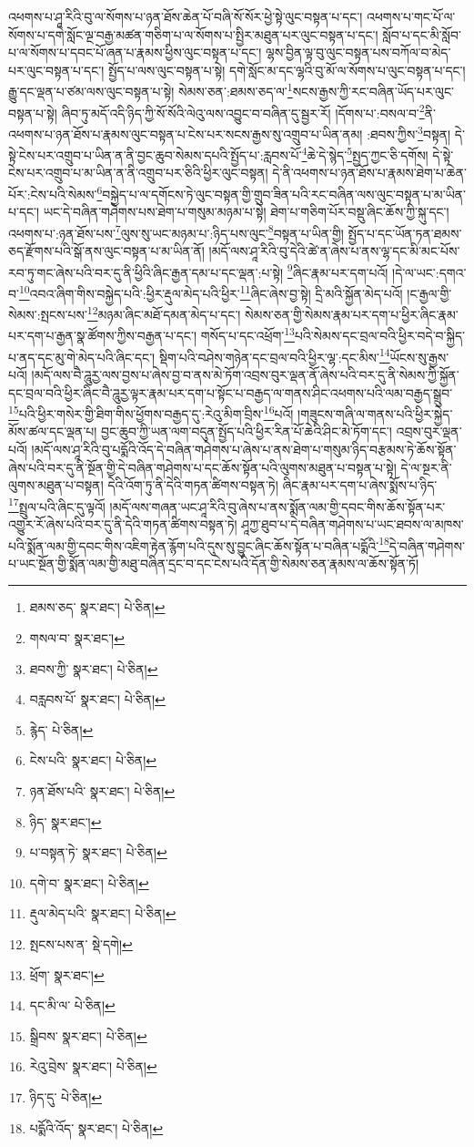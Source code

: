 འཕགས་པ་ཤཱ་རིའི་བུ་ལ་སོགས་པ་ཉན་ཐོས་ཆེན་པོ་བཞི་སོ་སོར་ཕྱེ་སྟེ་ལུང་བསྟན་པ་དང་། འཕགས་པ་གང་པོ་ལ་སོགས་པ་དགེ་སློང་ལྔ་བརྒྱ་མཚན་གཅིག་པ་ལ་སོགས་པ་སྤྱིར་མཐུན་པར་ལུང་བསྟན་པ་དང་། སློབ་པ་དང་མི་སློབ་པ་ལ་སོགས་པ་དབང་པོ་ཞན་པ་རྣམས་ཕྱིས་ལུང་བསྟན་པ་དང་། ལྷས་བྱིན་ལྟ་བུ་ལུང་བསྟན་པས་བཀོལ་བ་མེད་པར་ལུང་བསྟན་པ་དང་། སྤྱོད་པ་ལས་ལུང་བསྟན་པ་སྟེ། དགེ་སློང་མ་དང་ལྷའི་བུ་མོ་ལ་སོགས་པ་ལུང་བསྟན་པ་དང་། རྒྱུ་དང་ལྡན་པ་ཙམ་ལས་ལུང་བསྟན་པ་སྟེ། སེམས་ཅན་:ཐམས་ཅད་ལ་\footnote{ཐམས་ཅད་  སྣར་ཐང་།  པེ་ཅིན། }སངས་རྒྱས་ཀྱི་རང་བཞིན་ཡོད་པར་ལུང་བསྟན་པ་སྟེ། ཞིབ་ཏུ་མདོ་འདི་ཉིད་ཀྱི་སོ་སོའི་ལེའུ་ལས་འབྱུང་བ་བཞིན་དུ་སྦྱར་རོ། །དོགས་པ་:བསལ་བ་\footnote{གསལ་བ་  སྣར་ཐང་། }ནི་འཕགས་པ་ཉན་ཐོས་པ་རྣམས་ལུང་བསྟན་པ་ངེས་པར་སངས་རྒྱས་སུ་འགྲུབ་པ་ཡིན་ནམ། :ཐབས་ཀྱིས་\footnote{ཐབས་ཀྱི་  སྣར་ཐང་།  པེ་ཅིན། }བསྟན། དེ་སྟེ་ངེས་པར་འགྲུབ་པ་ཡིན་ན་ནི་བྱང་ཆུབ་སེམས་དཔའི་སྤྱོད་པ་:རླབས་པོ་\footnote{བརླབས་པོ་  སྣར་ཐང་།  པེ་ཅིན། }ཆེ་དེ་སྙེད་\footnote{རྙེད་  པེ་ཅིན། }སྤྱད་ཀྱང་ཅི་དགོས། དེ་སྟེ་ངེས་པར་འགྲུབ་པ་མ་ཡིན་ན་ནི་འགྲུབ་པར་ཅིའི་ཕྱིར་ལུང་བསྟན། དེ་ནི་འཕགས་པ་ཉན་ཐོས་པ་རྣམས་ཐེག་པ་ཆེན་པོར་:ངེས་པའི་སེམས་\footnote{ངེས་པའི་  སྣར་ཐང་།  པེ་ཅིན། }བསྐྱེད་པ་ལ་དགོངས་ཏེ་ལུང་བསྟན་གྱི་གྲུབ་ཟིན་པའི་རང་བཞིན་ལས་ལུང་བསྟན་པ་མ་ཡིན་པ་དང་། ཡང་དེ་བཞིན་གཤེགས་པས་ཐེག་པ་གསུམ་མཉམ་པ་སྟེ། ཐེག་པ་གཅིག་པོར་བསྡུ་ཞིང་ཆོས་ཀྱི་སྐུ་དང་། འཕགས་པ་:ཉན་ཐོས་པས་\footnote{ཉན་ཐོས་པའི་  སྣར་ཐང་།  པེ་ཅིན། }ལུས་སུ་ཡང་མཉམ་པ་:ཉིད་པས་ལུང་\footnote{ཉིད་  སྣར་ཐང་། }བསྟན་པ་ཡིན་གྱི། སྤྱོད་པ་དང་ཡོན་ཏན་ཐམས་ཅད་རྫོགས་པའི་སྒོ་ནས་ལུང་བསྟན་པ་མ་ཡིན་ནོ། །མདོ་ལས་ཤཱ་རིའི་བུ་དེའི་ཚེ་ན་ཞེས་པ་ནས་ལྷ་དང་མི་མང་པོས་རབ་ཏུ་གང་ཞེས་པའི་བར་དུ་ནི་ཕྱིའི་ཞིང་རྒྱན་དམ་པ་དང་ལྡན་:པ་སྟེ། \footnote{པ་བསྟན་ཏེ་  སྣར་ཐང་།  པེ་ཅིན། }ཞིང་རྣམ་པར་དག་པའོ། །དེ་ལ་ཡང་:དགའ་བ་\footnote{དགེ་བ་  སྣར་ཐང་།  པེ་ཅིན། }འབའ་ཞིག་གིས་བསྐྱེད་པའི་:ཕྱིར་རྡུལ་མེད་པའི་ཕྱིར་\footnote{རྡུལ་མེད་པའི་  སྣར་ཐང་།  པེ་ཅིན། }ཞིང་ཞེས་བྱ་སྟེ། དྲི་མའི་སྐྱོན་མེད་པའོ། །ང་རྒྱལ་གྱི་སེམས་:སྤངས་པས་\footnote{སྤངས་པས་ན་  སྡེ་དགེ། }མཉམ་ཞིང་མཐོ་དམན་མེད་པ་དང་། སེམས་ཅན་གྱི་སེམས་རྣམ་པར་དག་པ་ཕྱིར་ཞིང་རྣམ་པར་དག་པ་རྒྱན་སྣ་ཚོགས་ཀྱིས་བརྒྱན་པ་དང་། གསོད་པ་དང་འཕྲོག་\footnote{ཕྲོག་  སྣར་ཐང་། }པའི་སེམས་དང་བྲལ་བའི་ཕྱིར་བདེ་བ་སྐྱིད་པ་ནད་དང་མུ་གེ་མེད་པའི་ཞིང་དང་། སྡིག་པའི་བཤེས་གཉེན་དང་བྲལ་བའི་ཕྱིར་ལྷ་:དང་མིས་\footnote{དང་མི་ལ་  པེ་ཅིན། }ཡོངས་སུ་རྒྱས་པའོ། །མདོ་ལས་བཻ་ཌཱུརྱ་ལས་བྱས་པ་ཞེས་བྱ་བ་ནས་མེ་ཏོག་འབྲས་བུར་ལྡན་ནོ་ཞེས་པའི་བར་དུ་ནི་སེམས་ཀྱི་སྐྱོན་དང་བྲལ་བའི་ཕྱིར་ཞིང་བཻ་ཌཱུརྱ་ལྟར་རྣམ་པར་དག་པ་སྟོང་པ་བརྒྱད་ལ་གནས་ཤིང་འཕགས་པའི་ལམ་བརྒྱད་སྒྲུབ་\footnote{སྒྲིབས་  སྣར་ཐང་།  པེ་ཅིན། }པའི་ཕྱིར་གསེར་གྱི་ཐིག་གིས་ཕྱོགས་བརྒྱད་དུ་:རེའུ་མིག་བྲིས་\footnote{རེའུ་བྲེས་  སྣར་ཐང་།  པེ་ཅིན། }པའོ། །གཟུངས་གཞི་ལ་གནས་པའི་ཕྱིར་སྐྱེད་མོས་ཚལ་དང་ལྡན་པ། བྱང་ཆུབ་ཀྱི་ཡན་ལག་བདུན་སྤྱོད་པའི་ཕྱིར་རིན་པོ་ཆེའི་ཤིང་མེ་ཏོག་དང་། འབྲས་བུར་ལྡན་པའོ། །མདོ་ལས་ཤཱ་རིའི་བུ་པདྨོའི་འོད་དེ་བཞིན་གཤེགས་པ་ཞེས་པ་ནས་ཐེག་པ་གསུམ་ཉིད་བརྩམས་ཏེ་ཆོས་སྟོན་ཞེས་པའི་བར་དུ་ནི་སྔོན་གྱི་དེ་བཞིན་གཤེགས་པ་དང་ཆོས་སྟོན་པའི་ལུགས་མཐུན་པ་བསྟན་པ་སྟེ། དེ་ལ་སྔར་ནི་ལུགས་མཐུན་པ་བསྟན། དེའི་འོག་ཏུ་ནི་དེའི་གཏན་ཚིགས་བསྟན་ཏེ། ཞིང་རྣམ་པར་དག་པ་ཞེས་སྨོས་པ་ཉིད་\footnote{ཉིད་དུ་  པེ་ཅིན། }སྤྲུལ་པའི་ཞིང་དུ་ལྟའོ། །མདོ་ལས་གཞན་ཡང་ཤཱ་རིའི་བུ་ཞེས་པ་ནས་སྨོན་ལམ་གྱི་དབང་གིས་ཆོས་སྟོན་པར་འགྱུར་རོ་ཞེས་པའི་བར་དུ་ནི་དེའི་གཏན་ཚིགས་བསྟན་ཏེ། ཤཱཀྱ་ཐུབ་པ་དེ་བཞིན་གཤེགས་པ་ཡང་ཐབས་ལ་མཁས་པའི་སྨོན་ལམ་གྱི་དབང་གིས་འཇིག་རྟེན་རྙོག་པའི་དུས་སུ་བྱུང་ཞིང་ཆོས་སྟོན་པ་བཞིན་པདྨོའི་\footnote{པདྨོའི་འོད་  སྣར་ཐང་།  པེ་ཅིན། }དེ་བཞིན་གཤེགས་པ་ཡང་སྔོན་གྱི་སྨོན་ལམ་གྱི་མཐུ་བཞིན་དྲང་བ་དང་ངེས་པའི་དོན་གྱི་སེམས་ཅན་རྣམས་ལ་ཆོས་སྟོན་ཏོ། 